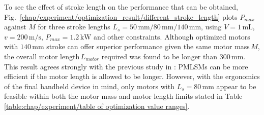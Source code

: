    
    To see the effect of stroke length on the performance that can be obtained, Fig.~\ref{chap/experiment/optimization_result/different_stroke_length} plots $P_{max}$ against $M$ for three stroke lengths $L_s=50\,\mathrm{mm}/80\,\mathrm{mm}/140\,\mathrm{mm}$, using $V = 1\,\mathrm{mL}$, $v = 200\,\mathrm{m/s}$,  $P_{max} = 1.2\,\mathrm{kW}$ and other constraints. Although optimized motors with $140\,\mathrm{mm}$ stroke can offer superior performance given the same motor mass\,$M$, the overall motor length\,$L_{motor}$ required was found to be longer than $300\,\mathrm{mm}$. This result agrees strongly with the previous study in \cite{Ruddy2015a}: \acsp{PMLSM} can be more efficient if the motor length is allowed to be longer. However, with the ergonomics of the final handheld device in mind, only motors with $L_s = 80\,\mathrm{mm}$ appear to be feasible within both the motor mass and motor length limits stated in Table\,\ref{table:chap/experiment/table of optimization value ranges}. 
    
